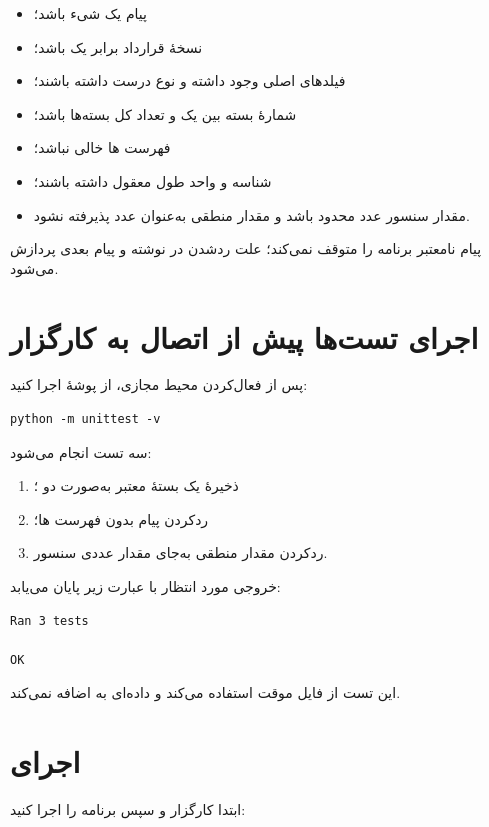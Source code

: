 \begin{itemize}
  \item پیام یک شیء
  باشد؛
  \item نسخهٔ قرارداد برابر یک باشد؛
  \item فیلدهای اصلی وجود داشته و نوع درست داشته باشند؛
  \item شمارهٔ بسته بین یک و تعداد کل بسته‌ها باشد؛
  \item فهرست
  ها خالی نباشد؛
  \item شناسه و واحد طول معقول داشته باشند؛
  \item مقدار سنسور عدد محدود باشد و مقدار منطقی به‌عنوان عدد پذیرفته نشود.
\end{itemize}

پیام نامعتبر برنامه را متوقف نمی‌کند؛ علت ردشدن در
نوشته و پیام بعدی پردازش می‌شود.

\section{اجرای تست‌ها پیش از اتصال به کارگزار}
پس از فعال‌کردن محیط مجازی، از پوشهٔ
اجرا کنید:

\begin{LTR}
\begin{lstlisting}
python -m unittest -v
\end{lstlisting}
\end{LTR}

سه تست انجام می‌شود:

\begin{enumerate}
  \item ذخیرهٔ یک بستهٔ معتبر به‌صورت دو
  ؛
  \item ردکردن پیام بدون فهرست
  ها؛
  \item ردکردن مقدار منطقی به‌جای مقدار عددی سنسور.
\end{enumerate}

خروجی مورد انتظار با عبارت زیر پایان می‌یابد:

\begin{LTR}
\begin{lstlisting}
Ran 3 tests

OK
\end{lstlisting}
\end{LTR}

این تست از فایل موقت استفاده می‌کند و داده‌ای به
اضافه نمی‌کند.

\section{اجرای
}
ابتدا کارگزار و سپس برنامه را اجرا کنید:

